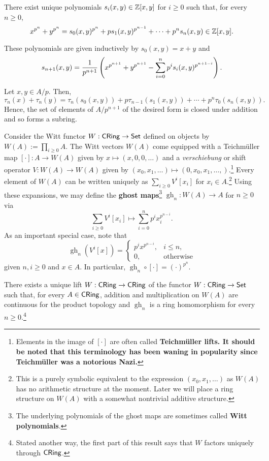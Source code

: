 \documentclass[11pt]{article}
\DeclareMathOperator{\gh}{gh}
\begin{document}
\begin{lemma}
There exist unique polynomials $s_i(x,y)\in\mathbb{Z}[x,y]$ for $i\geq0$ such that, for every $n\geq0$,
$$x^{p^n}+y^{p^n}=s_0(x,y)^{p^n}+ps_1(x,y)^{p^{n-1}}+\cdots+p^ns_n(x,y)\in\mathbb{Z}[x,y].$$
\end{lemma}

These polynomials are given inductively by $s_0(x,y)=x+y$ and 
$$s_{n+1}(x,y)=\dfrac{1}{p^{n+1}}\left(x^{p^{n+1}}+y^{p^{n+1}}-\sum_{i=0}^np^is_i(x,y)^{p^{n+1-i}}\right).$$

\begin{corollary}
Let $x,y\in A/p$. Then, 
$$\tau_n(x)+\tau_n(y)=\tau_n(s_0(x,y))+p\tau_{n-1}(s_1(x,y))+\cdots+p^n\tau_0(s_n(x,y)).$$
Hence, the set of elements of $A/p^{n+1}$ of the desired form is closed under addition and so forms a subring.
\end{corollary}

Consider the Witt functor $W: \operatorname{\mathsf{CRing}}\to\operatorname{\mathsf{Set}}$ defined on objects by $W(A):=\prod_{i\geq0}A$. The Witt vectors $W(A)$ come equipped with a Teichm\"{u}ller map $[\cdot]: A\to W(A)$ given by $x\mapsto(x,0,0,\ldots)$ and a \emph{verschiebung} or shift operator $V: W(A)\to W(A)$ given by $(x_0,x_1,\ldots)\mapsto(0,x_0,x_1,\ldots,)$.\footnote{Elements in the image of $[\cdot]$ are often called \textbf{Teichm\"{u}ller lifts. It should be noted that this terminology has been waning in popularity since Teichm\"{u}ller was a notorious Nazi.}} Every element of $W(A)$ can be written uniquely as $\sum_{i\geq0}V^i[x_i]$ for $x_i\in A$.\footnote{This is a purely symbolic equivalent to the expression $(x_0,x_1,\ldots)$ as $W(A)$ has no arithmetic structure at the moment. Later we will place a ring structure on $W(A)$ with a somewhat nontrivial additive structure.} Using these expansions, we may define the \textbf{ghost maps}\footnote{The underlying polynomials of the ghost maps are sometimes called \textbf{Witt polynomials}.} $\gh_n: W(A)\to A$ for $n\geq0$ via 
$$\sum_{i\geq0}V^i[x_i]\mapsto\sum_{i=0}^np^ix_i^{p^{n-i}}.$$
As an important special case, note that 
\begin{equation*}
\gh_n(V^i[x])=
\begin{cases}
p^ix^{p^{n-i}}, & i\leq n, \\
0, & \textrm{otherwise}
\end{cases}
\end{equation*}
given $n,i\geq0$ and $x\in A$. In particular, $\gh_n\circ[\cdot]=(\cdot)^{p^n}$.

\begin{theorem}
There exists a unique lift $W: \operatorname{\mathsf{CRing}}\to\operatorname{\mathsf{CRing}}$ of the functor $W: \operatorname{\mathsf{CRing}}\to\operatorname{\mathsf{Set}}$ such that, for every $A\in\operatorname{\mathsf{CRing}}$, addition and multiplication on $W(A)$ are continuous for the product topology and $\gh_n$ is a ring homomorphism for every $n\geq0$.\footnote{Stated another way, the first part of this result says that $W$ factors uniquely through $\operatorname{\mathsf{CRing}}$.}
\end{theorem}
\end{document}
